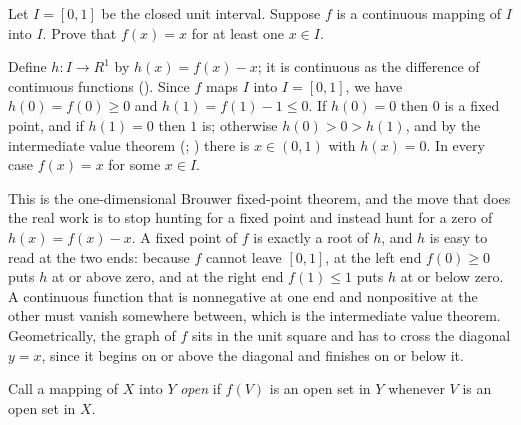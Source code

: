 \documentclass[main.tex]{subfiles}
\begin{document}
Let $I = [0, 1]$ be the closed unit interval. Suppose $f$ is a continuous mapping of $I$ into $I$. Prove that $f(x) = x$ for at least one $x \in I$.
\begin{Solution}
Define $h : I \to R^{1}$ by $h(x) = f(x) - x$; it is continuous as the difference of continuous functions (). Since $f$ maps $I$ into $I = [0, 1]$, we have $h(0) = f(0) \ge 0$ and $h(1) = f(1) - 1 \le 0$. If $h(0) = 0$ then $0$ is a fixed point, and if $h(1) = 0$ then $1$ is; otherwise $h(0) > 0 > h(1)$, and by the intermediate value theorem (; ) there is $x \in (0, 1)$ with $h(x) = 0$. In every case $f(x) = x$ for some $x \in I$.
\end{Solution}
\begin{Reflection}
This is the one-dimensional Brouwer fixed-point theorem, and the move that does the real work is to stop hunting for a fixed point and instead hunt for a zero of $h(x) = f(x) - x$. A fixed point of $f$ is exactly a root of $h$, and $h$ is easy to read at the two ends: because $f$ cannot leave $[0, 1]$, at the left end $f(0) \ge 0$ puts $h$ at or above zero, and at the right end $f(1) \le 1$ puts $h$ at or below zero. A continuous function that is nonnegative at one end and nonpositive at the other must vanish somewhere between, which is the intermediate value theorem. Geometrically, the graph of $f$ sits in the unit square and has to cross the diagonal $y = x$, since it begins on or above the diagonal and finishes on or below it.
\end{Reflection}

Call a mapping of $X$ into $Y$ \textit{open} if $f(V)$ is an open set in $Y$ whenever $V$ is an open set in $X$.
\end{document}
